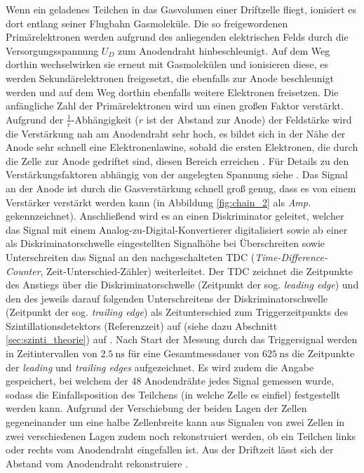 Wenn ein geladenes Teilchen in das Gasvolumen einer Driftzelle fliegt, ionisiert es dort entlang seiner Flugbahn Gasmoleküle. Die so freigewordenen Primärelektronen werden aufgrund des anliegenden elektrischen Felds durch die Versorgungsspannung $U_D$ zum Anodendraht hinbeschleunigt. Auf dem Weg dorthin wechselwirken sie erneut mit Gasmolekülen und ionisieren diese, es werden Sekundärelektronen freigesetzt, die ebenfalls zur Anode beschleunigt werden und auf dem Weg dorthin ebenfalls weitere Elektronen freisetzen. Die anfängliche Zahl der Primärelektronen wird um einen großen Faktor verstärkt. Aufgrund der $\frac{1}{r}$-Abhängigkeit ($r$ ist der Abstand zur Anode) der Feldstärke wird die Verstärkung nah am Anodendraht sehr hoch, es bildet sich in der Nähe der Anode sehr schnell eine Elektronenlawine, sobald die ersten Elektronen, die durch die Zelle zur Anode gedriftet sind, diesen Bereich erreichen \cite[15-17]{hammanndiplom}. Für Details zu den Verstärkungsfaktoren abhängig von der angelegten Spannung siehe \cite[127-129]{leotechniques}. Das Signal an der Anode ist durch die Gasverstärkung schnell groß genug, dass es von einem Verstärker verstärkt werden kann (in Abbildung \ref{fig:chain_2} als \textit{Amp.} gekennzeichnet). Anschließend wird es an einen Diskriminator geleitet, welcher das Signal mit einem Analog-zu-Digital-Konvertierer digitalisiert sowie ab einer als Diskriminatorschwelle eingestellten Signalhöhe bei Überschreiten sowie Unterschreiten das Signal an den nachgeschalteten TDC (\textit{Time-Difference-Counter}, Zeit-Unterschied-Zähler) weiterleitet. Der TDC zeichnet die Zeitpunkte des Anstiegs über die Diskriminatorschwelle (Zeitpunkt der sog. \textit{leading edge}) und den des jeweils darauf folgenden Unterschreitens der Diskriminatorschwelle (Zeitpunkt der sog. \textit{trailing edge}) als Zeitunterschied zum Triggerzeitpunkts des Szintillationsdetektors (Referenzzeit) auf (siehe dazu Abschnitt \ref{sec:szinti_theorie}) auf \cite[17]{hammanndiplom}. Nach Start der Messung durch das Triggersignal werden in Zeitintervallen von $\SI{2.5}{\nano\s}$ für eine Gesamtmessdauer von $\SI{625}{\nano\s}$ die Zeitpunkte der \textit{leading} und \textit{trailing edges} aufgezeichnet. Es wird zudem die Angabe gespeichert, bei welchem der 48 Anodendrähte jedes Signal gemessen wurde, sodass die Einfallsposition des Teilchens (in welche Zelle es einfiel) festgestellt werden kann\cite[6]{515versuchsanleitung}. Aufgrund der Verschiebung der beiden Lagen der Zellen gegeneinander um eine halbe Zellenbreite kann aus Signalen von zwei Zellen in zwei verschiedenen Lagen zudem noch rekonstruiert werden, ob ein Teilchen links oder rechts vom Anodendraht eingefallen ist. Aus der Driftzeit lässt sich der Abstand vom Anodendraht rekonstruiere \cite[18-19]{hammanndiplom}.

